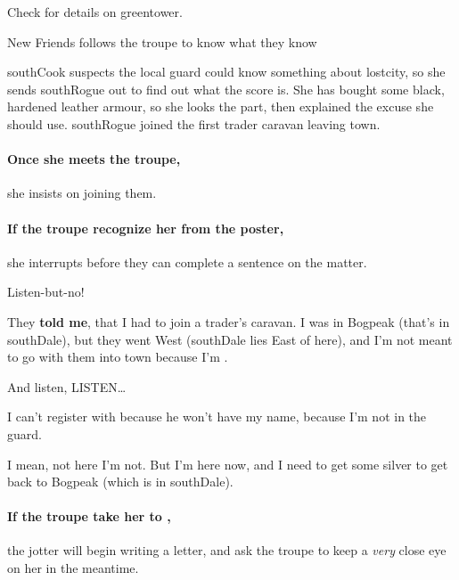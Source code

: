 Check  for details on \gls{greentower}.

{New Friends}%
{ follows the troupe to know what they know}%

\Gls{southCook} suspects the local \gls{guard} could know something about \gls{lostcity}, so she sends \gls{southRogue} out to find out what the score is.
She has bought  some black, hardened leather armour, so she looks the part, then explained the excuse she should use.
\Gls{southRogue} joined the first trader caravan leaving \gls{town}.

\paragraph{Once she meets the troupe,}
she insists on joining them.

\paragraph{If the troupe recognize her from the poster,}
she interrupts before they can complete a sentence on the matter.

\begin{exampletext}
  Listen-but-no!
  
  They \textbf {told me}, that I had to join a trader's caravan.
  I was in Bogpeak (that's in \gls{southDale}), but they went West (\gls{southDale} lies East of here), and I'm not meant to go with them into \gls{town} because I'm .
  
  And listen, LISTEN\ldots

  I can't register with  because he won't have my name, because I'm not in the \gls{guard}.

  I mean, not here I'm not.
  But I'm here now, and I need to get some silver to get back to Bogpeak (which is in \gls{southDale}).
\end{exampletext}

\paragraph{If the troupe take her to ,}
the \gls{jotter} will begin writing a letter, and ask the troupe to keep a \textit{very} close eye on her in the meantime.

\southRogue %
\label{southRogue}

